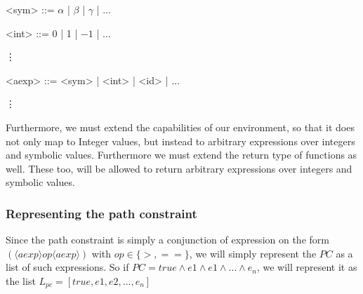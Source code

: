 \begin{grammar}
	<sym> ::= $\alpha$ | $\beta$ | $\gamma$ | $\ldots$
	
	<int> ::= 0 | 1 | $-1$ | $\ldots$
	
	\vdots
	
	<aexp> ::= <sym> | <int> | <id> | $\ldots$
	
	\vdots
\end{grammar}

Furthermore, we must extend the capabilities of our environment, so that it does not only map to Integer values, but instead to arbitrary expressions over integers and symbolic values. Furthermore we must extend the return type of functions as well. These too, will be allowed to return arbitrary expressions over integers and symbolic values. 

\subsubsection{Representing the path constraint}

Since the path constraint is simply a conjunction of expression on the form 
$(\langle aexp \rangle op \langle aexp \rangle)$  with  $op \in \{ >, == \}$, we will simply represent the $PC$ as a list of such expressions. So if $PC = true \land e1 \land e1 \land \ldots \land e_n$, we will represent it as the list $L_{pc} = [true, e1, e2, \ldots, e_n]$